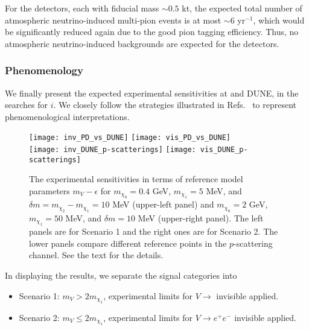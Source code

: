 For the  detectors, each with fiducial mass $\sim0.5$ kt, the expected total number of atmospheric neutrino-induced multi-pion events is at most $\sim 6$ yr$^{-1}$, which would be significantly reduced again due to the good pion tagging efficiency. 
Thus, no atmospheric neutrino-induced backgrounds are expected for the  detectors.  



\subsubsection{Phenomenology}\label{Sec:Pheno}

We finally present the expected experimental sensitivities at  and DUNE, in the searches for $i$. 
We closely follow the strategies illustrated in Refs.~\cite{Giudice:2017zke, Chatterjee:2018mej, Kim:2018veo} to represent phenomenological interpretations. 

\begin{figure}[t]
\centering
\texttt{[image: inv\_PD\_vs\_DUNE]} 
\texttt{[image: vis\_PD\_vs\_DUNE]} \\
\vspace{0.3cm}
\texttt{[image: inv\_DUNE\_p-scatterings]}
\texttt{[image: vis\_DUNE\_p-scatterings]}
\caption[Experimental sensitivities for $m_{\chi_n}$ values in terms of $m_V - \epsilon$]{
The experimental sensitivities in terms of reference model parameters $m_V - \epsilon$ 
for $m_{\chi_0} = 0.4$ GeV, $m_{\chi_1} = 5$ MeV, and $\delta m = m_{\chi_2} - m_{\chi_1} = 10$ MeV (upper-left panel) and $m_{\chi_0} = 2$ GeV, $m_{\chi_1} = 50$ MeV, and $\delta m = 10$ MeV (upper-right panel).
The left panels are for Scenario 1 and the right ones are for Scenario 2.
The lower panels compare different reference points in the $p$-scattering channel.
See the text for the details.
\label{fig:darkphotonparameter} }
\end{figure}


In displaying the results, we separate the signal categories into %
\begin{itemize}
\item Scenario 1: $m_V > 2 m_{\chi_1}$, experimental limits for $V \to$ invisible  applied.
\item Scenario 2: $m_V \le 2 m_{\chi_1}$, experimental limits for $V \to e^+ e^-$ invisible  applied.
\end{itemize}

